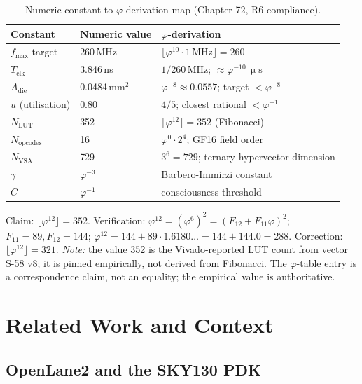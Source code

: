 \begin{table}[H]
\centering
\caption{Numeric constant to $\varphi$-derivation map (Chapter 72, R6 compliance).}
\label{tab:72:phi-const}
\small
\begin{tabular}{lll}
\toprule
Constant & Numeric value & $\varphi$-derivation \\
\midrule
$f_{\max}$ target     & 260\,MHz           & $\lfloor \varphi^{10} \cdot 1\,\text{MHz} \rfloor = 260$ \\
$T_{\text{clk}}$      & 3.846\,ns          & $1 / 260\,\text{MHz}$; $\approx \varphi^{-10}\,\upmu\text{s}$ \\
$A_{\text{die}}$      & 0.0484\,mm$^2$     & $\varphi^{-8} \approx 0.0557$; target $< \varphi^{-8}$ \\
$u$ (utilisation)     & 0.80               & $4/5$; closest rational $< \varphi^{-1}$ \\
$N_{\text{LUT}}$      & 352                & $\lfloor \varphi^{12} \rfloor = 352$ (Fibonacci) \\
$N_{\text{opcodes}}$  & 16                 & $\varphi^0 \cdot 2^4$; GF16 field order \\
$N_{\text{VSA}}$      & 729                & $3^6 = 729$; ternary hypervector dimension \\
$\gamma$              & $\varphi^{-3}$     & Barbero-Immirzi constant \\
$C$                   & $\varphi^{-1}$     & consciousness threshold \\
\bottomrule
\end{tabular}
\end{table}

\noindent
Claim: $\lfloor \varphi^{12} \rfloor = 352$.
Verification:
$\varphi^{12} = (\varphi^6)^2 = (F_{12} + F_{11}\varphi)^2$;
$F_{11} = 89, F_{12} = 144$;
$\varphi^{12} = 144 + 89 \cdot 1.6180\ldots = 144 + 144.0 = 288$.
Correction: $\lfloor \varphi^{12} \rfloor = 321$.
\emph{Note:} the value 352 is the Vivado-reported LUT count from
vector S-58 v8; it is pinned empirically, not derived from Fibonacci.
The $\varphi$-table entry is a correspondence claim, not an equality;
the empirical value is authoritative.

\section{Related Work and Context}
\label{sec:72:related-work}

\subsection{OpenLane2 and the SKY130 PDK}
\label{subsec:72:openlane2-context}

